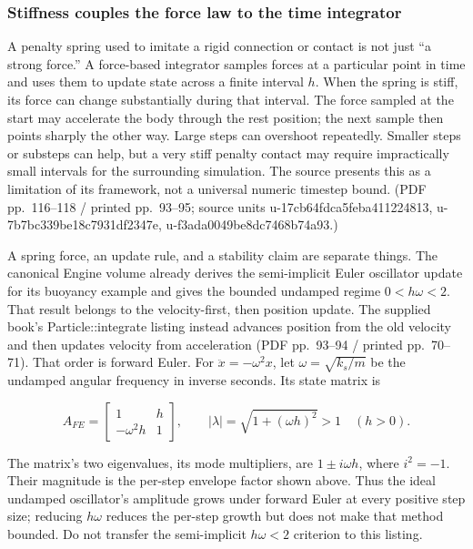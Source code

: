 \subsubsection{Stiffness couples the force law to the time integrator}\label{stiffness-couples-the-force-law-to-the-time-integrator}

A penalty spring used to imitate a rigid connection or contact is not just ``a strong force.'' A force-based integrator samples forces at a particular point in time and uses them to update state across a finite interval \(h\). When the spring is stiff, its force can change substantially during that interval. The force sampled at the start may accelerate the body through the rest position; the next sample then points sharply the other way. Large steps can overshoot repeatedly. Smaller steps or substeps can help, but a very stiff penalty contact may require impractically small intervals for the surrounding simulation. The source presents this as a limitation of its framework, not a universal numeric timestep bound. (PDF pp.~116--118 / printed pp.~93--95; source units u-17cb64fdca5feba411224813, u-7b7bc339be18c7931df2347e, u-f3ada0049be8dc7468b74a93.)

A spring force, an update rule, and a stability claim are separate things. The canonical Engine volume already derives the semi-implicit Euler oscillator update for its buoyancy example and gives the bounded undamped regime \(0<h\omega<2\). That result belongs to the velocity-first, then position update. The supplied book's Particle::integrate listing instead advances position from the old velocity and then updates velocity from acceleration (PDF pp.~93--94 / printed pp.~70--71). That order is forward Euler. For \(\ddot{x}=-\omega^2x\), let \(\omega=\sqrt{k_s/m}\) be the undamped angular frequency in inverse seconds. Its state matrix is

\[
A_{FE}=\begin{bmatrix}1&h\\-\omega^2h&1\end{bmatrix},
\qquad |\lambda|=\sqrt{1+(\omega h)^2}>1\quad(h>0).
\]

The matrix's two eigenvalues, its mode multipliers, are \(1\pm i\omega h\), where \(i^2=-1\). Their magnitude is the per-step envelope factor shown above. Thus the ideal undamped oscillator's amplitude grows under forward Euler at every positive step size; reducing \(h\omega\) reduces the per-step growth but does not make that method bounded. Do not transfer the semi-implicit \(h\omega<2\) criterion to this listing.


